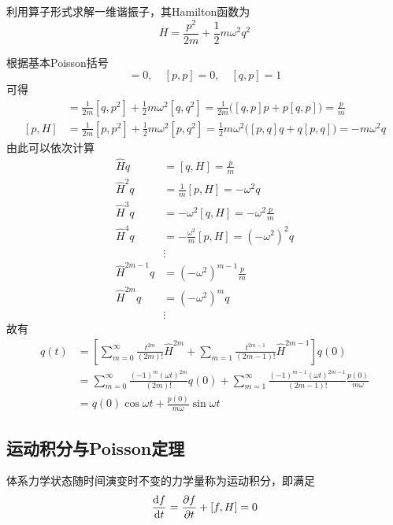 \begin{example}
利用算子形式求解一维谐振子，其Hamilton函数为
\begin{equation*}
	H = \frac{p^2}{2m} + \frac12 m\omega^2 q^2
\end{equation*}
\end{example}
\begin{solution}
根据基本Poisson括号
\begin{equation*}
	[q,q] = 0,\quad [p,p] = 0,\quad [q,p] = 1
\end{equation*}
可得
\begin{align*}
	[q,H] & = \frac{1}{2m}[q,p^2] + \frac12 m\omega^2 [q,q^2] = \frac{1}{2m} \bigg([q,p]p+p[q,p]\bigg) = \frac{p}{m} \\
	[p,H] & = \frac{1}{2m}[p,p^2] + \frac12 m\omega^2 [p,q^2] = \frac12 m\omega^2 \bigg([p,q]q+q[p,q]\bigg) = -m\omega^2 q
\end{align*}
由此可以依次计算
\begin{align*}
	\hat{H}q & = [q,H] = \frac{p}{m} \\
	\hat{H}^2q & = \frac{1}{m}[p,H] = -\omega^2 q \\
	\hat{H}^3q & = -\omega^2[q,H] = -\omega^2\frac{p}{m} \\
	\hat{H}^4q & = -\frac{\omega^2}{m}[p,H] = (-\omega^2)^2 q \\
	& \vdots \\
	\hat{H}^{2m-1} q & = (-\omega^2)^{m-1} \frac{p}{m} \\
	\hat{H}^{2m} q & = (-\omega^2)^m q \\
	& \vdots 
\end{align*}
故有
\begin{align*}
	q(t) & = \left[\sum_{m=0}^\infty \frac{t^{2m}}{(2m)!} \hat{H}^{2m} + \sum_{m=1} \frac{t^{2m-1}}{(2m-1)!} \hat{H}^{2m-1}\right] q(0) \\
	& = \sum_{m=0}^\infty \frac{(-1)^m(\omega t)^{2m}}{(2m)!} q(0) + \sum_{m=1}^\infty \frac{(-1)^{m-1}(\omega t)^{2m-1}}{(2m-1)!} \frac{p(0)}{m\omega} \\
	& = q(0) \cos \omega t + \frac{p(0)}{m\omega} \sin \omega t
\end{align*}
\end{solution}

\subsection{运动积分与Poisson定理}

体系力学状态随时间演变时不变的力学量称为{\heiti 运动积分}，即满足
\begin{equation}
	\frac{\mathrm{d} f}{\mathrm{d} t} = \frac{\partial f}{\partial t} + [f,H] = 0
\end{equation}

